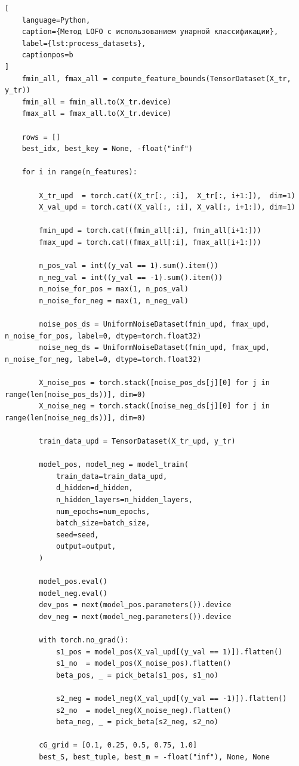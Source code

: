 \documentclass[12pt,a4paper]{article}
\begin{document}
\begin{lstlisting}[
    language=Python,
    caption={Метод LOFO с использованием унарной классификации},
    label={lst:process_datasets},
    captionpos=b
]
    fmin_all, fmax_all = compute_feature_bounds(TensorDataset(X_tr, y_tr))
    fmin_all = fmin_all.to(X_tr.device)
    fmax_all = fmax_all.to(X_tr.device)

    rows = []
    best_idx, best_key = None, -float("inf")

    for i in range(n_features):

        X_tr_upd  = torch.cat((X_tr[:, :i],  X_tr[:, i+1:]),  dim=1)
        X_val_upd = torch.cat((X_val[:, :i], X_val[:, i+1:]), dim=1)

        fmin_upd = torch.cat((fmin_all[:i], fmin_all[i+1:]))
        fmax_upd = torch.cat((fmax_all[:i], fmax_all[i+1:]))

        n_pos_val = int((y_val == 1).sum().item())
        n_neg_val = int((y_val == -1).sum().item())
        n_noise_for_pos = max(1, n_pos_val)
        n_noise_for_neg = max(1, n_neg_val)

        noise_pos_ds = UniformNoiseDataset(fmin_upd, fmax_upd, n_noise_for_pos, label=0, dtype=torch.float32)
        noise_neg_ds = UniformNoiseDataset(fmin_upd, fmax_upd, n_noise_for_neg, label=0, dtype=torch.float32)

        X_noise_pos = torch.stack([noise_pos_ds[j][0] for j in range(len(noise_pos_ds))], dim=0)
        X_noise_neg = torch.stack([noise_neg_ds[j][0] for j in range(len(noise_neg_ds))], dim=0)

        train_data_upd = TensorDataset(X_tr_upd, y_tr)

        model_pos, model_neg = model_train(
            train_data=train_data_upd,
            d_hidden=d_hidden,
            n_hidden_layers=n_hidden_layers,
            num_epochs=num_epochs,
            batch_size=batch_size,
            seed=seed,
            output=output,
        )

        model_pos.eval()
        model_neg.eval()
        dev_pos = next(model_pos.parameters()).device
        dev_neg = next(model_neg.parameters()).device

        with torch.no_grad():
            s1_pos = model_pos(X_val_upd[(y_val == 1)]).flatten()
            s1_no  = model_pos(X_noise_pos).flatten()
            beta_pos, _ = pick_beta(s1_pos, s1_no)

            s2_neg = model_neg(X_val_upd[(y_val == -1)]).flatten()
            s2_no  = model_neg(X_noise_neg).flatten()
            beta_neg, _ = pick_beta(s2_neg, s2_no)

        cG_grid = [0.1, 0.25, 0.5, 0.75, 1.0]
        best_S, best_tuple, best_m = -float("inf"), None, None


\end{lstlisting}
\end{document}
